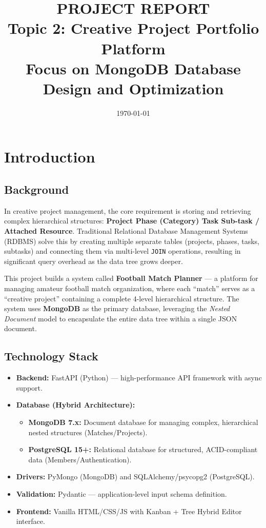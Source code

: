 \documentclass[a4paper,12pt]{article}
\title{\textbf{PROJECT REPORT}\\[0.3cm]\Large Topic 2: Creative Project Portfolio Platform\\[0.5cm]\large Focus on MongoDB Database Design and Optimization}
\author{}
\date{\today}
\begin{document}
\maketitle
\tableofcontents
\newpage

\section{Introduction}

\subsection{Background}
In creative project management, the core requirement is storing and retrieving complex hierarchical structures: \textbf{Project {\textrightarrow} Phase (Category) {\textrightarrow} Task {\textrightarrow} Sub-task / Attached Resource}. Traditional Relational Database Management Systems (RDBMS) solve this by creating multiple separate tables (projects, phases, tasks, subtasks) and connecting them via multi-level \texttt{JOIN} operations, resulting in significant query overhead as the data tree grows deeper.

This project builds a system called \textbf{Football Match Planner} --- a platform for managing amateur football match organization, where each ``match'' serves as a ``creative project'' containing a complete 4-level hierarchical structure. The system uses \textbf{MongoDB} as the primary database, leveraging the \textit{Nested Document} model to encapsulate the entire data tree within a single JSON document.

\subsection{Technology Stack}
\begin{itemize}
    \item \textbf{Backend:} FastAPI (Python) --- high-performance API framework with async support.
    \item \textbf{Database (Hybrid Architecture):} 
    \begin{itemize}
        \item \textbf{MongoDB 7.x:} Document database for managing complex, hierarchical nested structures (Matches/Projects).
        \item \textbf{PostgreSQL 15+:} Relational database for structured, ACID-compliant data (Members/Authentication).
    \end{itemize}
    \item \textbf{Drivers:} PyMongo (MongoDB) and SQLAlchemy/psycopg2 (PostgreSQL).
    \item \textbf{Validation:} Pydantic --- application-level input schema definition.
    \item \textbf{Frontend:} Vanilla HTML/CSS/JS with Kanban + Tree Hybrid Editor interface.
\end{itemize}
\end{document}
